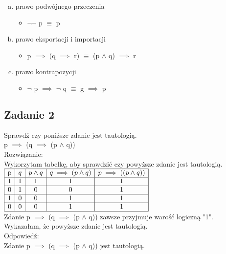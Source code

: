\documentclass[10pt]{mwart}
\theoremstyle{plain} \newtheorem{tw}{Twierdzenie}[section]
\theoremstyle{plain} \newtheorem{lem}[tw]{Lemat}
\theoremstyle{definition} \newtheorem{df}[tw]{Definicja}
\begin{document}
\begin{enumerate}[a)]
\begin{itemize}
   \end{itemize}
   \item prawo podwójnego przeczenia
   \begin{itemize}
       \item \(\neg \neg\) p \(\equiv\) p
   \end{itemize}
   \item prawo eksportacji i importacji
   \begin{itemize}
       \item p \(\implies\) (q \(\implies\) r) \(\equiv\) (p \(\wedge\) q) \(\implies\) r
   \end{itemize}
   \item prawo kontrapozycji
   \begin{itemize}
       \item \(\neg\) p \(\implies\) \(\neg\) q \(\equiv\) g \(\implies\) p
   \end{itemize}
\end{enumerate}
\subsection{Zadanie 2}
Sprawdź czy poniższe zdanie jest tautologią.\\
p \(\implies\) (q \(\implies\) (p \(\wedge\) q))\cite{odnośnik1}\\
Rozwiązanie:\\
Wykorzytam tabelkę, aby sprawdzić czy powyższe zdanie jest tautologią.\\
\(
\begin{array}{|c|c|c|c|c|}
\hline\mbox{p} & q & p \wedge q & q \implies (p \wedge q ) & p \implies ( (p \wedge q ))\\\hline
\mbox{1} & 1 & 1 & 1 & 1 \\\hline
\mbox{0} & 1 & 0 & 0 & 1 \\\hline
\mbox{1} & 0 & 0 & 1 & 1\\\hline
\mbox{0} & 0& 0 & 1& 1 \\\hline
\end{array}\)\\
Zdanie p \(\implies\) (q \(\implies\) (p \(\wedge\) q)) zawsze przyjmuje warość logiczną "1". Wykazałam, że powyższe zdanie jest tautologią.\\
Odpowiedź:\\ Zdanie p \(\implies\) (q \(\implies\) (p \(\wedge\) q)) jest tautologią.
\end{document}
